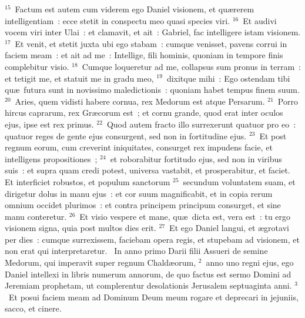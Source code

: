 ${}^{15}$~Factum est autem cum viderem ego Daniel visionem, et qu\ae rerem intelligentiam~: ecce stetit in conspectu meo quasi species viri.
${}^{16}$~Et audivi vocem viri inter Ulai~: et clamavit, et ait~: Gabriel, fac intelligere istam visionem.
${}^{17}$~Et venit, et stetit juxta ubi ego stabam~: cumque venisset, pavens corrui in faciem meam~: et ait ad me~: Intellige, fili hominis, quoniam in tempore finis complebitur visio.
${}^{18}$~Cumque loqueretur ad me, collapsus sum pronus in terram~: et tetigit me, et statuit me in gradu meo,
${}^{19}$~dixitque mihi~: Ego ostendam tibi qu\ae\ futura sunt in novissimo maledictionis~: quoniam habet tempus finem suum.
${}^{20}$~Aries, quem vidisti habere cornua, rex Medorum est atque Persarum.
${}^{21}$~Porro hircus caprarum, rex Gr\ae corum est~; et cornu grande, quod erat inter oculos ejus, ipse est rex primus.
${}^{22}$~Quod autem fracto illo surrexerunt quatuor pro eo~: quatuor reges de gente ejus consurgent, sed non in fortitudine ejus.
${}^{23}$~Et post regnum eorum, cum creverint iniquitates, consurget rex impudens facie, et intelligens propositiones~;
${}^{24}$~et roborabitur fortitudo ejus, sed non in viribus suis~: et supra quam credi potest, universa vastabit, et prosperabitur, et faciet. Et interficiet robustos, et populum sanctorum
${}^{25}$~secundum voluntatem suam, et dirigetur dolus in manu ejus~: et cor suum magnificabit, et in copia rerum omnium occidet plurimos~: et contra principem principum consurget, et sine manu conteretur.
${}^{26}$~Et visio vespere et mane, qu\ae\ dicta est, vera est~: tu ergo visionem signa, quia post multos dies erit.
${}^{27}$~Et ego Daniel langui, et \ae grotavi per dies~: cumque surrexissem, faciebam opera regis, et stupebam ad visionem, et non erat qui interpretaretur.
~\lettrine[lines=10,image=true,loversize=0.05,lraise=-0.03]{I}{}n anno primo Darii filii Assueri de semine Medorum, qui imperavit super regnum Chald\ae orum,
${}^{2}$~anno uno regni ejus, ego Daniel intellexi in libris numerum annorum, de quo factus est sermo Domini ad Jeremiam prophetam, ut complerentur desolationis Jerusalem septuaginta anni.
${}^{3}$~Et posui faciem meam ad Dominum Deum meum rogare et deprecari in jejuniis, sacco, et cinere.


